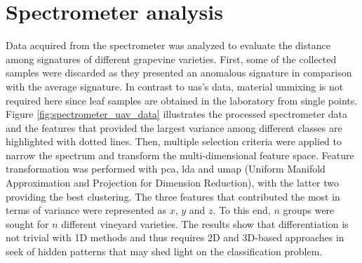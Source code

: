 \section{Spectrometer analysis}

Data acquired from the spectrometer was analyzed to evaluate the distance among signatures of different grapevine varieties. First, some of the collected samples were discarded as they presented an anomalous signature in comparison with the average signature. In contrast to \acrshort{uas}'s data, material unmixing is not required here since leaf samples are obtained in the laboratory from single points. Figure \ref{fig:spectrometer_uav_data} illustrates the processed spectrometer data and the features that provided the largest variance among different classes are highlighted with dotted lines. Then, multiple selection criteria were applied to narrow the spectrum and transform the multi-dimensional feature space. Feature transformation was performed with \acrshort{pca}, \acrshort{lda} and \acrshort{umap} (Uniform Manifold Approximation and Projection for Dimension Reduction), with the latter two providing the best clustering. The three features that contributed the most in terms of variance were represented as $x$, $y$ and $z$. To this end, $n$ groups were sought for $n$ different vineyard varieties. The results show that differentiation is not trivial with 1D methods and thus requires 2D and 3D-based approaches in seek of hidden patterns that may shed light on the classification problem.

